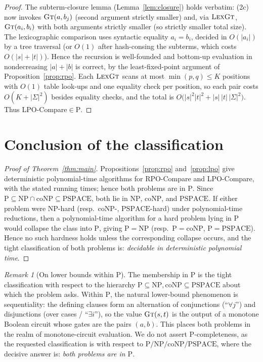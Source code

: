 \documentclass{amsart}
\theoremstyle{definition}
\theoremstyle{remark}
\newtheorem{remark}{Remark}
\newcommand{\sig}{\Sigma}
\newcommand{\size}[1]{|#1|}
\begin{document}
\begin{proof}
The subterm-closure lemma (Lemma~\ref{lem:closure}) holds verbatim: (2c) now
invokes $\textsc{Gt}(a,b_j)$ (second argument strictly smaller) and, via
$\textsc{LexGt}$, $\textsc{Gt}(a_i,b_i)$ with both arguments strictly smaller (so
strictly smaller total size). The lexicographic comparison uses syntactic
equality $a_i=b_i$, decided in $O(\size{a_i})$ by a tree traversal (or $O(1)$
after hash-consing the subterms, which costs $O(\size{s}+\size{t})$). Hence the
recursion is well-founded and bottom-up evaluation in nondecreasing
$\size{a}+\size{b}$ is correct, by the least-fixed-point argument of
Proposition~\ref{prop:rpo}. Each $\textsc{LexGt}$ scans at most
$\min(p,q)\le K$ positions with $O(1)$ table look-ups and one equality check per
position, so each pair costs $O(K+\size{\sig}^2)$ besides equality checks, and
the total is $O\bigl(\size{s}^2\size{t}^2+\size{s}\,\size{t}\,\size{\sig}^2\bigr)$.
Thus {\sc LPO-Compare}$\in\mathrm{P}$.
\end{proof}

\section{Conclusion of the classification}

\begin{proof}[Proof of Theorem~\ref{thm:main}]
Propositions~\ref{prop:rpo} and~\ref{prop:lpo} give deterministic
polynomial-time algorithms for {\sc RPO-Compare} and {\sc LPO-Compare}, with the
stated running times; hence both problems are in $\mathrm{P}$. Since
$\mathrm{P}\subseteq\mathrm{NP}\cap\mathrm{coNP}\subseteq\mathrm{PSPACE}$, both
lie in $\mathrm{NP}$, $\mathrm{coNP}$, and $\mathrm{PSPACE}$. If either problem
were $\mathrm{NP}$-hard (resp.\ $\mathrm{coNP}$-, $\mathrm{PSPACE}$-hard) under
polynomial-time reductions, then a polynomial-time algorithm for a hard problem
lying in $\mathrm{P}$ would collapse the class into $\mathrm{P}$, giving
$\mathrm{P}=\mathrm{NP}$ (resp.\ $\mathrm{P}=\mathrm{coNP}$,
$\mathrm{P}=\mathrm{PSPACE}$). Hence no such hardness holds unless the
corresponding collapse occurs, and the tight classification of both problems is:
\emph{decidable in deterministic polynomial time}.
\end{proof}

\begin{remark}[On lower bounds within $\mathrm{P}$]\label{rem:lower}
The membership in $\mathrm{P}$ is the tight classification with respect to the
hierarchy $\mathrm{P}\subseteq\mathrm{NP},\mathrm{coNP}\subseteq\mathrm{PSPACE}$
about which the problem asks. Within $\mathrm{P}$, the natural lower-bound
phenomenon is sequentiality: the defining clauses form an alternation of
conjunctions (``$\forall j$'') and disjunctions (over cases / ``$\exists i$''),
so the value $\textsc{Gt}(s,t)$ is the output of a monotone Boolean circuit whose
gates are the pairs $(a,b)$. This places both problems in the realm of
monotone-circuit evaluation. We do not assert $\mathrm{P}$-completeness, as the
requested classification is with respect to
$\mathrm{P}/\mathrm{NP}/\mathrm{coNP}/\mathrm{PSPACE}$, where the decisive answer
is: \emph{both problems are in $\mathrm{P}$}.
\end{remark}
\end{document}
